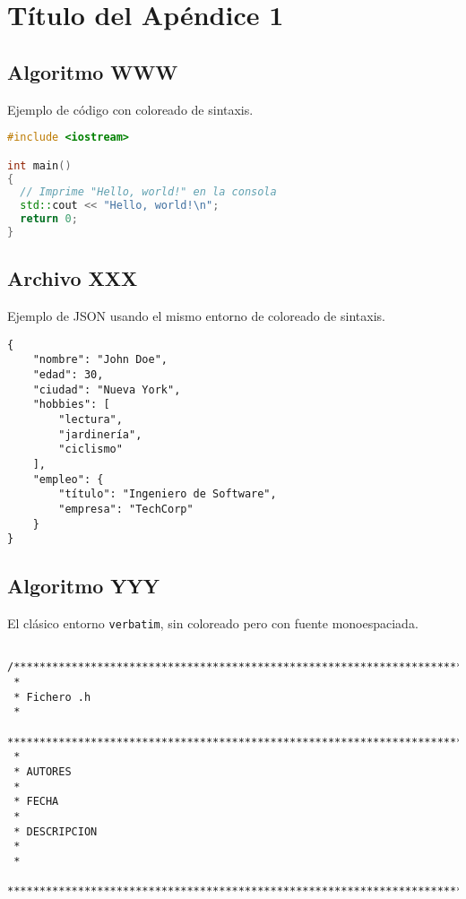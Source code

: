 \chapter{Título del Apéndice 1}
\label{apx:1}

\section{Algoritmo WWW}
\label{sec:WWW}

\noindent Ejemplo de código con coloreado de sintaxis.

\begin{lstlisting}[language=C++]
#include <iostream>

int main()
{
  // Imprime "Hello, world!" en la consola
  std::cout << "Hello, world!\n";
  return 0;
}
\end{lstlisting}

\section{Archivo XXX}
\label{sec:XXX}

\noindent Ejemplo de JSON usando el mismo entorno de coloreado de sintaxis.

\begin{lstlisting}
{
    "nombre": "John Doe",
    "edad": 30,
    "ciudad": "Nueva York",
    "hobbies": [
        "lectura",
        "jardinería",
        "ciclismo"
    ],
    "empleo": {
        "título": "Ingeniero de Software",
        "empresa": "TechCorp"
    }
}
\end{lstlisting}
 
\section{Algoritmo YYY}
\label{Apendice1:YYY}

\noindent El clásico entorno \texttt{verbatim}, sin coloreado pero con fuente monoespaciada.

\begin{center}
\begin{footnotesize}
\begin{verbatim}

/***********************************************************************************
 *
 * Fichero .h
 *
 ***********************************************************************************
 *
 * AUTORES
 *
 * FECHA
 *
 * DESCRIPCION
 *
 *
 ************************************************************************************/
 
\end{verbatim}
\end{footnotesize}
\end{center}

